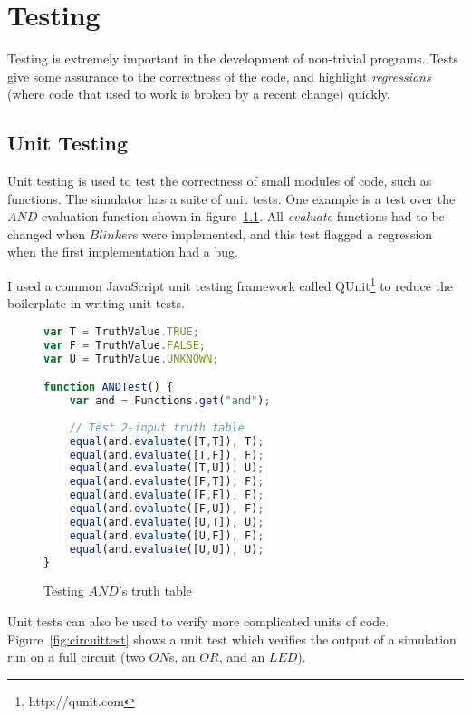 \chapter{Testing}
Testing is extremely important in the development of non-trivial programs. Tests give some assurance to the correctness of the code, and highlight \textit{regressions} (where code that used to work is broken by a recent change) quickly.

\section{Unit Testing}
Unit testing is used to test the correctness of small modules of code, such as functions. The simulator has a suite of unit tests. One example is a test over the $AND$ evaluation function shown in figure~\ref{fig:andtest}. All \textit{evaluate} functions had to be changed when $Blinker$s were implemented, and this test flagged a regression when the first implementation had a bug.

I used a common JavaScript unit testing framework called QUnit\footnote{http://qunit.com} to reduce the boilerplate in writing unit tests.

\begin{figure}
\begin{lstlisting}[language=JavaScript]
var T = TruthValue.TRUE;
var F = TruthValue.FALSE;
var U = TruthValue.UNKNOWN;

function ANDTest() {
	var and = Functions.get("and");	
	
	// Test 2-input truth table
	equal(and.evaluate([T,T]), T);
	equal(and.evaluate([T,F]), F);
	equal(and.evaluate([T,U]), U);
	equal(and.evaluate([F,T]), F);
	equal(and.evaluate([F,F]), F);
	equal(and.evaluate([F,U]), F);
	equal(and.evaluate([U,T]), U);
	equal(and.evaluate([U,F]), F);
	equal(and.evaluate([U,U]), U);
}
\end{lstlisting}
\caption{Testing $AND$'s truth table}
\label{fig:andtest}
\end{figure}

Unit tests can also be used to verify more complicated units of code. Figure~\ref{fig:circuittest} shows a unit test which verifies the output of a simulation run on a full circuit (two $ON$s, an $OR$, and an $LED$).

